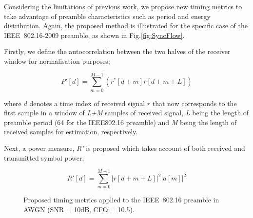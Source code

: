 Considering the limitations of previous work, we propose new timing metrics to take advantage of preamble characteristics such as period and energy distribution. 
Again, the proposed method is illustrated for the specific case of the IEEE~802.16-2009 preamble, as shown in Fig.\ref{fig:SyncFlow}.

Firstly, we define the autocorrelation between the two halves of the receiver window for normalisation purposes;

\begin{equation}
\label{ProposedP}
P'[d] =\sum_{m =0}^{M-1}    (r^{*}[d+m] r[d+m+L] )
\end{equation}

where $d$ denotes a time index of received signal $r$ that now corresponds to the first sample in a window of \emph{L+M} samples of received signal, \emph{L} being the length of preamble period (64 for the IEEE802.16 preamble) and \emph{M} being the length of received samples for estimation, respectively. 

Next, a power measure, \emph{R'} is proposed which takes account of both received and transmitted symbol power;

\begin{equation}
\label{ProposedR}
R'[d] =\sum_{m =0}^{M-1}   |r[d+m+L]|^2  |a[m]|^2
\end{equation} 


\begin{figure}
\centering
	\caption{Proposed timing metrics applied to the IEEE~802.16 preamble in AWGN (SNR = 10{\thinspace}dB, CFO = 10.5).}
	\label{fig:ProposedMetric-10dB}
\end{figure}


